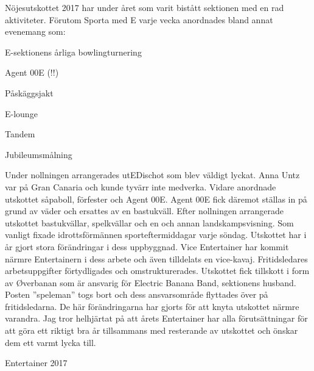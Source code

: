 \documentclass[../_main/handlingar.tex]{subfiles}
\begin{document}
Nöjesutskottet 2017 har under året som varit bistått sektionen med en rad aktiviteter.
Förutom Sporta med E varje vecka anordnades bland annat evenemang som:
\begin{dashlist}
 \item E-sektionens årliga bowlingturnering
 \item Agent 00E (!!)
 \item Påskäggsjakt
 \item E-lounge
 \item Tandem
 \item Jubileumsmålning
\end{dashlist}
Under nollningen arrangerades utEDischot som blev väldigt lyckat. Anna Untz var på Gran
Canaria och kunde tyvärr inte medverka. Vidare anordnade utskottet såpaboll, förfester
och Agent 00E. Agent 00E fick däremot ställas in på grund av väder och ersattes av en
bastukväll.
Efter nollningen arrangerade utskottet bastukvällar, spelkvällar och en och annan
landskampsvisning. Som vanligt fixade idrottsförmännen sporteftermiddagar varje söndag.
Utskottet har i år gjort stora förändringar i dess uppbyggnad. Vice Entertainer har kommit
närmre Entertainern i dess arbete och även tilldelats en vice-kavaj. Fritidsledares
arbetsuppgifter förtydligades och omstrukturerades. Utskottet fick tillskott i form av
Øverbanan som är ansvarig för Electric Banana Band, sektionens husband. Posten
”speleman” togs bort och dess ansvarsområde flyttades över på fritidsledarna.
De här förändringarna har gjorts för att knyta utskottet närmre varandra. Jag tror helhjärtat
på att årets Entertainer har alla förutsättningar för att göra ett riktigt bra år tillsammans
med resterande av utskottet och önskar dem ett varmt lycka till.
\begin{signatures}{1}
    \mvh
    \signature{Albin Nyström Eklund}{Entertainer 2017}
\end{signatures}
\end{document}
